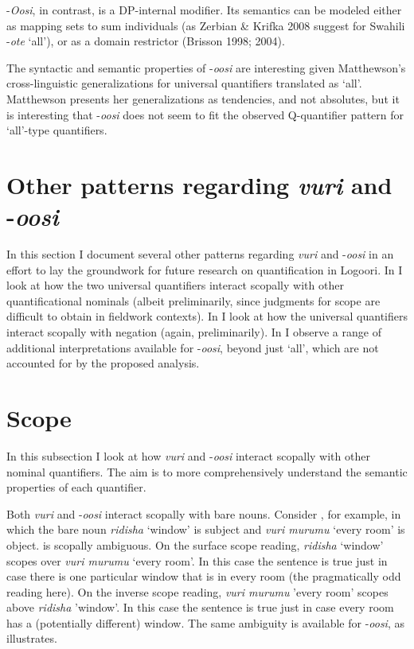 \documentclass[output=paper]{langsci/langscibook}
\begin{document}
  {}-\textit{Oosi}, in contrast, is a DP-internal modifier. Its semantics can be modeled either as mapping sets to sum individuals (as Zerbian \& Krifka 2008 suggest for Swahili -\textit{ote} ‘all’), or as a domain restrictor (Brisson 1998; 2004). 

  The syntactic and semantic properties of -\textit{oosi} are interesting given Matthewson's cross-linguistic generalizations for universal quantifiers translated as ‘all’. Matthewson presents her generalizations as tendencies, and not absolutes, but it is interesting that -\textit{oosi} does not seem to fit the observed Q-quantifier pattern for ‘all’-type quantifiers. 

\section{Other patterns regarding \textit{vuri} and -\textit{oosi}}

  In this section I document several other patterns regarding \textit{vuri} and -\textit{oosi} in an effort to lay the groundwork for future research on quantification in Logoori. In  I look at how the two universal quantifiers interact scopally with other quantificational nominals (albeit preliminarily, since judgments for scope are difficult to obtain in fieldwork contexts). In  I look at how the universal quantifiers interact scopally with negation (again, preliminarily). In  I observe a range of additional interpretations available for -\textit{oosi}, beyond just ‘all’, which are not accounted for by the proposed analysis.

\section{Scope} 

  In this subsection I look at how \textit{vuri} and -\textit{oosi} interact scopally with other nominal quantifiers. The aim is to more comprehensively understand the semantic properties of each quantifier.

  Both \textit{vuri} and -\textit{oosi} interact scopally with bare nouns. Consider , for example, in which the bare noun \textit{ridisha} ‘window’ is subject and \textit{vuri murumu} ‘every room’ is object.  is scopally ambiguous. On the surface scope reading, \textit{ridisha} ‘window’ scopes over \textit{vuri murumu} ‘every room’. In this case the sentence is true just in case there is one particular window that is in every room (the pragmatically odd reading here). On the inverse scope reading, \textit{vuri murumu} 'every room' scopes above \textit{ridisha} 'window'. In this case the sentence is true just in case every room has a (potentially different) window. The same ambiguity is available for -\textit{oosi}, as  illustrates.
\end{document}
